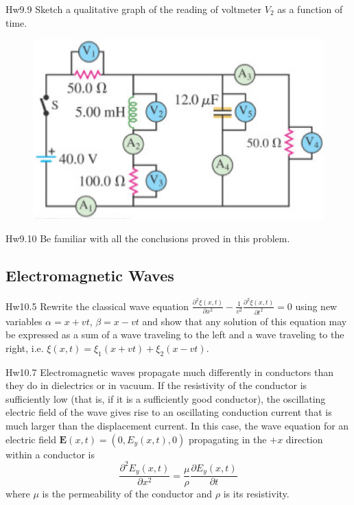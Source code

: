 \documentclass{beamer}
\begin{document}
\begin{frame}{Hw9.9}
    Sketch a qualitative graph of the reading of voltmeter $V_2$ as a function of time.

    \begin{figure}[htbp]
        \centering
        \includegraphics[scale=0.8]{images/hw9_9.png}
    \end{figure}
\end{frame}

\begin{frame}{Hw9.10}
    Be familiar with all the conclusions proved in this problem.
\end{frame}

\subsection{Electromagnetic Waves}

\begin{frame}{Hw10.5}
    Rewrite the classical wave equation $\frac{\partial^{2} \xi(x, t)}{\partial x^{2}}-\frac{1}{v^{2}} \frac{\partial^{2} \xi(x, t)}{\partial t^{2}}=0$ using new variables $\alpha=x+v t$, $\beta=x-v t$ and show that any solution of this equation may be expressed as a sum of a wave traveling to the left and a wave traveling to the right, i.e. $\xi(x, t)=\xi_{1}(x+v t)+\xi_{2}(x-v t)$.
\end{frame}

\begin{frame}{Hw10.7}
    \small
    Electromagnetic waves propagate much differently in conductors than they do in dielectrics or in vacuum. If the resistivity of the conductor is sufficiently low (that is, if it is a sufficiently good conductor), the oscillating electric field of the wave gives rise to an oscillating conduction current that is much larger than the displacement current. In this case, the wave equation for an electric field $\mathbf{E}(x, t)=\left(0, E_{y}(x, t), 0\right)$ propagating in the $+x$ direction within a conductor is
$$
\frac{\partial^{2} E_{y}(x, t)}{\partial x^{2}}=\frac{\mu}{\rho} \frac{\partial E_{y}(x, t)}{\partial t}
$$
where $\mu$ is the permeability of the conductor and $\rho$ is its resistivity.
\end{frame}
\end{document}
